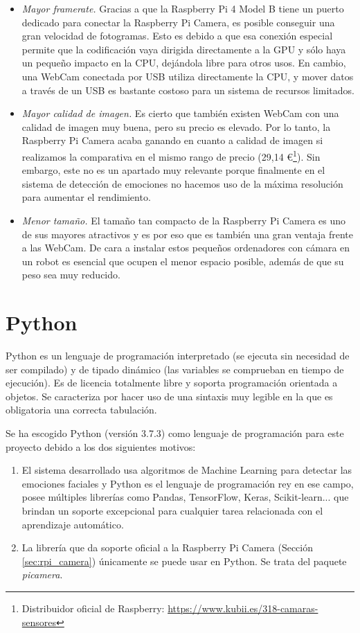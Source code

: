 \begin{itemize}
    \item \textit{Mayor framerate.} Gracias a que la Raspberry Pi 4 Model B tiene un puerto dedicado para conectar la Raspberry Pi Camera, es posible conseguir una gran velocidad de fotogramas. Esto es debido a que esa conexión especial permite que la codificación vaya dirigida directamente a la GPU y sólo haya un pequeño impacto en la CPU, dejándola libre para otros usos. En cambio, una WebCam conectada por USB utiliza directamente la CPU, y mover datos a través de un USB es bastante costoso para un sistema de recursos limitados.
    
    \item \textit{Mayor calidad de imagen.} Es cierto que también existen WebCam con una calidad de imagen muy buena, pero su precio es elevado. Por lo tanto, la Raspberry Pi Camera acaba ganando en cuanto a calidad de imagen si realizamos la comparativa en el mismo rango de precio (29,14 \euro\footnote{Distribuidor oficial de Raspberry: \url{https://www.kubii.es/318-camaras-sensores}}). Sin embargo, este no es un apartado muy relevante porque finalmente en el sistema de detección de emociones no hacemos uso de la máxima resolución para aumentar el rendimiento.
    
    \item \textit{Menor tamaño.} El tamaño tan compacto de la Raspberry Pi Camera es uno de sus mayores atractivos y es por eso que es también una gran ventaja frente a las WebCam. De cara a instalar estos pequeños ordenadores con cámara en un robot es esencial que ocupen el menor espacio posible, además de que su peso sea muy reducido.
\end{itemize}

\section{Python}

Python es un lenguaje de programación interpretado (se ejecuta sin necesidad de ser compilado) y de tipado dinámico (las variables se comprueban en tiempo de ejecución). Es de licencia totalmente libre y soporta programación orientada a objetos. Se caracteriza por hacer uso de una sintaxis muy legible en la que es obligatoria una correcta tabulación. 

Se ha escogido Python (versión 3.7.3) como lenguaje de programación para este proyecto debido a los dos siguientes motivos:

\begin{enumerate}
    \item El sistema desarrollado usa algoritmos de Machine Learning para detectar las emociones faciales y Python es el lenguaje de programación rey en ese campo, posee múltiples librerías como Pandas, TensorFlow, Keras, Scikit-learn... que brindan un soporte excepcional para cualquier tarea relacionada con el aprendizaje automático.
    
    \item La librería que da soporte oficial a la Raspberry Pi Camera (Sección \ref{sec:rpi_camera}) únicamente se puede usar en Python. Se trata del paquete \textit{picamera}.
\end{enumerate}


